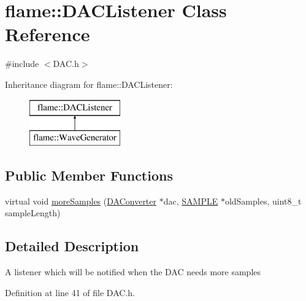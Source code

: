 \hypertarget{classflame_1_1_d_a_c_listener}{\section{flame\-:\-:D\-A\-C\-Listener Class Reference}
\label{classflame_1_1_d_a_c_listener}
}


{\ttfamily \#include $<$D\-A\-C.\-h$>$}

Inheritance diagram for flame\-:\-:D\-A\-C\-Listener\-:\begin{figure}[H]
\begin{center}
\leavevmode
\includegraphics[height=2.000000cm]{classflame_1_1_d_a_c_listener}
\end{center}
\end{figure}
\subsection*{Public Member Functions}
\begin{DoxyCompactItemize}
\item 
virtual void \hyperlink{classflame_1_1_d_a_c_listener_a00ede324c36c05647dc31b770e4e1443}{more\-Samples} (\hyperlink{classflame_1_1_d_a_converter}{D\-A\-Converter} $\ast$dac, \hyperlink{_d_a_c_8h_a5a6d1dc37ffa32957a63868cd1da39b3}{S\-A\-M\-P\-L\-E} $\ast$old\-Samples, uint8\-\_\-t sample\-Length)
\end{DoxyCompactItemize}


\subsection{Detailed Description}
A listener which will be notified when the D\-A\-C needs more samples 

Definition at line 41 of file D\-A\-C.\-h.



